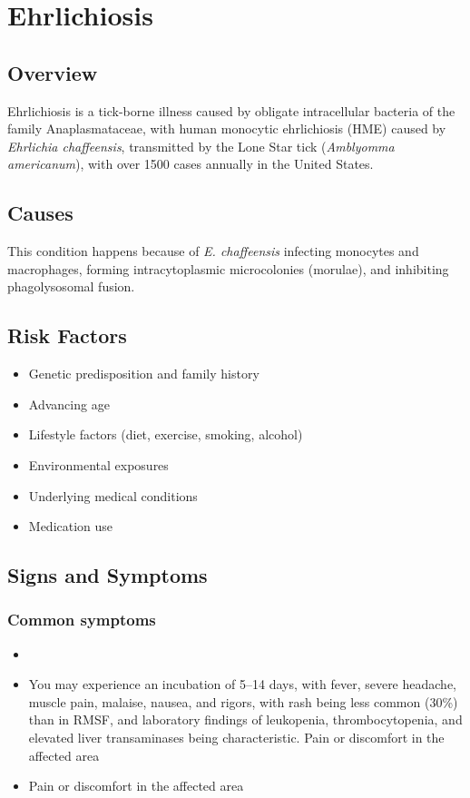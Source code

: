 \chapter{Ehrlichiosis}
\label{sec:Ehrlichiosis}

\section{Overview}
Ehrlichiosis is a tick-borne illness caused by obligate intracellular bacteria of the family Anaplasmataceae, with human monocytic ehrlichiosis (HME) caused by \textit{Ehrlichia chaffeensis}, transmitted by the Lone Star tick (\textit{Amblyomma americanum}), with over 1500 cases annually in the United States.
\section{Causes}
This condition happens because of \textit{E. chaffeensis} infecting monocytes and macrophages, forming intracytoplasmic microcolonies (morulae), and inhibiting phagolysosomal fusion.     
\section{Risk Factors}

\begin{itemize}[noitemsep]
  \item Genetic predisposition and family history
  \item Advancing age
  \item Lifestyle factors (diet, exercise, smoking, alcohol)
  \item Environmental exposures
  \item Underlying medical conditions
  \item Medication use
\end{itemize}
\section{Signs and Symptoms}

\subsection{Common symptoms}
\begin{itemize}[noitemsep]
  \item \item You may experience an incubation of 5--14 days, with fever, severe headache, muscle pain, malaise, nausea, and rigors, with rash being less common (30\%) than in RMSF, and laboratory findings of leukopenia, thrombocytopenia, and elevated liver transaminases being characteristic. Pain or discomfort in the affected area    \item Pain or discomfort in the affected area
  \end{itemize}

